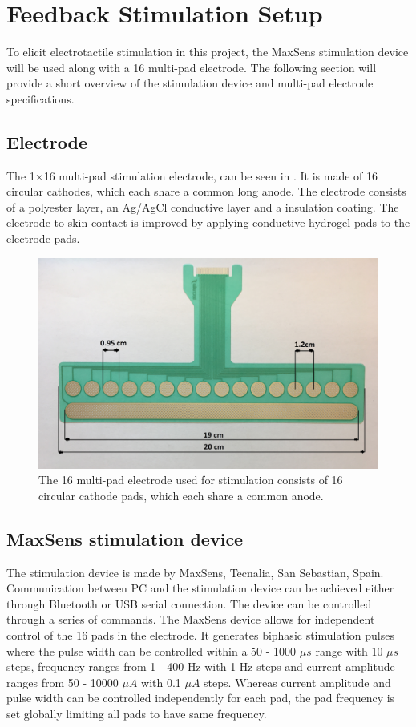 \section{Feedback Stimulation Setup}

To elicit electrotactile stimulation in this project, the MaxSens stimulation device will be used along with a 16 multi-pad electrode. The following section will provide a short overview of the stimulation device and multi-pad electrode specifications. 
 

\subsection{Electrode}

The 1$\times$16 multi-pad stimulation electrode, can be seen in . It is made of 16 circular cathodes, which each share a common long anode. The electrode consists of a polyester layer, an Ag/AgCl conductive layer and a insulation coating. The electrode to skin contact is improved by applying conductive hydrogel pads to the electrode pads. \cite{Strbac2016}     

\begin{figure}[H]                 
	\includegraphics[width=.57\textwidth]{figures/electrode}  
	\caption{The 16 multi-pad electrode used for stimulation consists of 16 circular cathode pads, which each share a common anode.}
	\label{fig:electrode} 
\end{figure}

\subsection{MaxSens stimulation device}

The stimulation device is made by MaxSens, Tecnalia, San Sebastian, Spain. Communication between PC and the stimulation device can be achieved either through Bluetooth or USB serial connection. The device can be controlled through a series of commands. The MaxSens device allows for independent control of the 16 pads in the electrode. It generates biphasic stimulation pulses where the pulse width can be controlled within a 50 - 1000 $\mu s$ range with 10 $\mu s$ steps, frequency ranges from 1 - 400 Hz with 1 Hz steps and current amplitude ranges from 50 - 10000 $\mu A$ with 0.1 $\mu A$ steps. Whereas current amplitude and pulse width can be controlled independently for each pad, the pad frequency is set globally limiting all pads to have same frequency.    